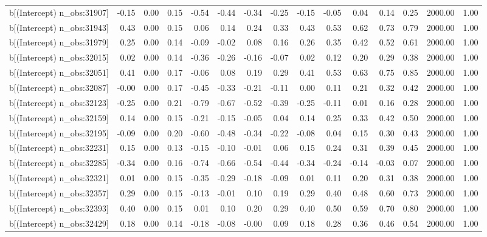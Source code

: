 \begin{table}[ht]
\begin{tabular}{rrrrrrrrrrrrrrr}
  b[(Intercept) n\_obs:31907] & -0.15 & 0.00 & 0.15 & -0.54 & -0.44 & -0.34 & -0.25 & -0.15 & -0.05 & 0.04 & 0.14 & 0.25 & 2000.00 & 1.00 \\ 
  b[(Intercept) n\_obs:31943] & 0.43 & 0.00 & 0.15 & 0.06 & 0.14 & 0.24 & 0.33 & 0.43 & 0.53 & 0.62 & 0.73 & 0.79 & 2000.00 & 1.00 \\ 
  b[(Intercept) n\_obs:31979] & 0.25 & 0.00 & 0.14 & -0.09 & -0.02 & 0.08 & 0.16 & 0.26 & 0.35 & 0.42 & 0.52 & 0.61 & 2000.00 & 1.00 \\ 
  b[(Intercept) n\_obs:32015] & 0.02 & 0.00 & 0.14 & -0.36 & -0.26 & -0.16 & -0.07 & 0.02 & 0.12 & 0.20 & 0.29 & 0.38 & 2000.00 & 1.00 \\ 
  b[(Intercept) n\_obs:32051] & 0.41 & 0.00 & 0.17 & -0.06 & 0.08 & 0.19 & 0.29 & 0.41 & 0.53 & 0.63 & 0.75 & 0.85 & 2000.00 & 1.00 \\ 
  b[(Intercept) n\_obs:32087] & -0.00 & 0.00 & 0.17 & -0.45 & -0.33 & -0.21 & -0.11 & 0.00 & 0.11 & 0.21 & 0.32 & 0.42 & 2000.00 & 1.00 \\ 
  b[(Intercept) n\_obs:32123] & -0.25 & 0.00 & 0.21 & -0.79 & -0.67 & -0.52 & -0.39 & -0.25 & -0.11 & 0.01 & 0.16 & 0.28 & 2000.00 & 1.00 \\ 
  b[(Intercept) n\_obs:32159] & 0.14 & 0.00 & 0.15 & -0.21 & -0.15 & -0.05 & 0.04 & 0.14 & 0.25 & 0.33 & 0.42 & 0.50 & 2000.00 & 1.00 \\ 
  b[(Intercept) n\_obs:32195] & -0.09 & 0.00 & 0.20 & -0.60 & -0.48 & -0.34 & -0.22 & -0.08 & 0.04 & 0.15 & 0.30 & 0.43 & 2000.00 & 1.00 \\ 
  b[(Intercept) n\_obs:32231] & 0.15 & 0.00 & 0.13 & -0.15 & -0.10 & -0.01 & 0.06 & 0.15 & 0.24 & 0.31 & 0.39 & 0.45 & 2000.00 & 1.00 \\ 
  b[(Intercept) n\_obs:32285] & -0.34 & 0.00 & 0.16 & -0.74 & -0.66 & -0.54 & -0.44 & -0.34 & -0.24 & -0.14 & -0.03 & 0.07 & 2000.00 & 1.00 \\ 
  b[(Intercept) n\_obs:32321] & 0.01 & 0.00 & 0.15 & -0.35 & -0.29 & -0.18 & -0.09 & 0.01 & 0.11 & 0.20 & 0.31 & 0.38 & 2000.00 & 1.00 \\ 
  b[(Intercept) n\_obs:32357] & 0.29 & 0.00 & 0.15 & -0.13 & -0.01 & 0.10 & 0.19 & 0.29 & 0.40 & 0.48 & 0.60 & 0.73 & 2000.00 & 1.00 \\ 
  b[(Intercept) n\_obs:32393] & 0.40 & 0.00 & 0.15 & 0.01 & 0.10 & 0.20 & 0.29 & 0.40 & 0.50 & 0.59 & 0.70 & 0.80 & 2000.00 & 1.00 \\ 
  b[(Intercept) n\_obs:32429] & 0.18 & 0.00 & 0.14 & -0.18 & -0.08 & -0.00 & 0.09 & 0.18 & 0.28 & 0.36 & 0.46 & 0.54 & 2000.00 & 1.00 \\ 

\end{tabular}
\end{table}
